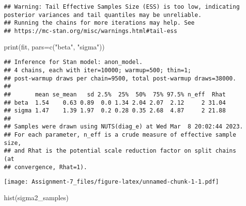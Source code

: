 \documentclass[
]{article}
\newenvironment{Shaded}{\begin{snugshade}}{\end{snugshade}}
\newcommand{\AttributeTok}[1]{\textcolor[rgb]{0.77,0.63,0.00}{#1}}
\newcommand{\CommentTok}[1]{\textcolor[rgb]{0.56,0.35,0.01}{\textit{#1}}}
\newcommand{\DecValTok}[1]{\textcolor[rgb]{0.00,0.00,0.81}{#1}}
\newcommand{\FunctionTok}[1]{\textcolor[rgb]{0.00,0.00,0.00}{#1}}
\newcommand{\NormalTok}[1]{#1}
\newcommand{\OtherTok}[1]{\textcolor[rgb]{0.56,0.35,0.01}{#1}}
\newcommand{\SpecialCharTok}[1]{\textcolor[rgb]{0.00,0.00,0.00}{#1}}
\newcommand{\StringTok}[1]{\textcolor[rgb]{0.31,0.60,0.02}{#1}}
\begin{document}
\begin{verbatim}
## Warning: Tail Effective Samples Size (ESS) is too low, indicating posterior variances and tail quantiles may be unreliable.
## Running the chains for more iterations may help. See
## https://mc-stan.org/misc/warnings.html#tail-ess
\end{verbatim}

\begin{Shaded}
\begin{Highlighting}[]
\FunctionTok{print}\NormalTok{(fit, }\AttributeTok{pars=}\FunctionTok{c}\NormalTok{(}\StringTok{"beta"}\NormalTok{, }\StringTok{"sigma"}\NormalTok{))}
\end{Highlighting}
\end{Shaded}

\begin{verbatim}
## Inference for Stan model: anon_model.
## 4 chains, each with iter=10000; warmup=500; thin=1; 
## post-warmup draws per chain=9500, total post-warmup draws=38000.
## 
##       mean se_mean   sd 2.5%  25%  50%  75% 97.5% n_eff  Rhat
## beta  1.54    0.63 0.89  0.0 1.34 2.04 2.07  2.12     2 31.04
## sigma 1.47    1.39 1.97  0.2 0.28 0.35 2.68  4.87     2 21.88
## 
## Samples were drawn using NUTS(diag_e) at Wed Mar  8 20:02:44 2023.
## For each parameter, n_eff is a crude measure of effective sample size,
## and Rhat is the potential scale reduction factor on split chains (at 
## convergence, Rhat=1).
\end{verbatim}

\begin{Shaded}
\end{Shaded}

\texttt{[image: Assignment-7\_files/figure-latex/unnamed-chunk-1-1.pdf]}

\begin{Shaded}
\begin{Highlighting}[]
\FunctionTok{hist}\NormalTok{(sigma2\_samples)}
\end{Highlighting}
\end{Shaded}
\end{document}
